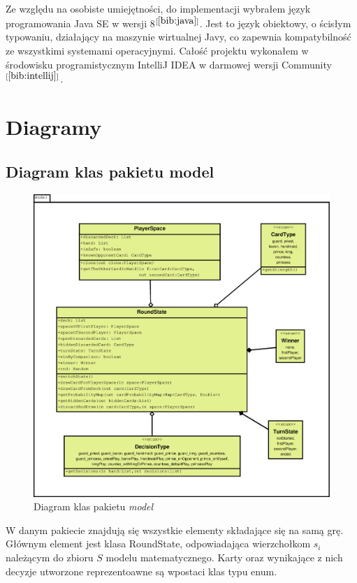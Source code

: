 Ze względu na osobiste umiejętności, do implementacji wybrałem język programowania Java SE w wersji 8$^{[\ref{bib:java}]}$. Jest to język obiektowy, o ścisłym typowaniu, działający na maszynie wirtualnej Javy, co zapewnia kompatybilność ze wszystkimi systemami operacyjnymi. Całość projektu wykonałem w środowisku programistycznym IntelliJ IDEA w darmowej wersji Community$^{[\ref{bib:intellij}]}$.

\section{Diagramy}

\subsection{Diagram klas pakietu model}

\begin{figure}[H]
	\centering
	\includegraphics[width=\textwidth]{Resources/diagramKlas_model.eps}
	\caption{Diagram klas pakietu \textit{model}} 
	\label{fig:llMainImage}
\end{figure}

W danym pakiecie znajdują się wszystkie elementy składające się na samą grę. Głównym element jest klasa RoundState, odpowiadająca wierzchołkom $s_i$ należącym do zbioru $S$ modelu matematycznego. Karty oraz wynikające z nich decyzje utworzone reprezentoawne są wpostaci klas typu enum.

